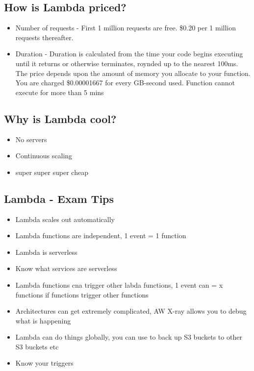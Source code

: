 \documentclass{article}
\begin{document}
\subsection{How is Lambda priced?}
\begin{itemize}
\item
Number of requests - First 1 million requests are free. \$0.20 per 1 million requests thereafter.

\item
Duration - Duration is calculated from the time your code begins executing until it returns or otherwise terminates, roynded up to the nearest 100ms. The price depends upon the amount of memory you allocate to your function. You are charged \$0.00001667 for every GB-second used. Function cannot execute for more than 5 mins
\end{itemize}

\subsection{Why is Lambda cool?}
\begin{itemize}
\item
No servers

\item
Continuous scaling

\item
super super super cheap
\end{itemize}

\subsection{Lambda - Exam Tips}
\begin{itemize}
\item
Lambda scales out automatically

\item
Lambda functions are independent, 1 event = 1 function

\item
Lambda is serverless

\item
Know what services are serverless

\item
Lambda functions cna trigger other labda functions, 1 event can = x functions if functions trigger other functions

\item
Architectures can get extremely complicated, AW X-ray allows you to debug what is happening

\item
Lambda can do things globally, you can use to back up S3 buckets to other S3 buckets etc

\item
Know your triggers
\end{itemize}
\end{document}
